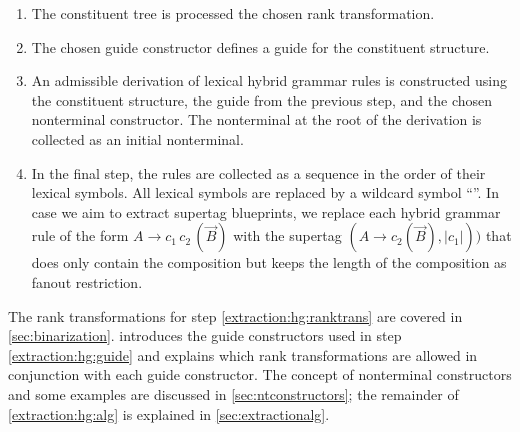 \documentclass[../../document.tex]{subfiles}
\begin{document}
    \begin{enumerate}
        \item\label{extraction:hg:ranktrans}
            The constituent tree is processed the chosen rank transformation.
        \item\label{extraction:hg:guide}
            The chosen guide constructor defines a guide for the constituent structure.
        \item\label{extraction:hg:alg}
            An admissible derivation of lexical hybrid grammar rules is constructed using the constituent structure, the guide from the previous step, and the chosen nonterminal constructor.
            The  nonterminal at the root of the derivation is collected as an initial nonterminal.
        \item
            In the final step, the rules are collected as a sequence in the order of their lexical symbols.
            All lexical symbols are replaced by a wildcard symbol ``\tn{*}''.
            In case we aim to extract  supertag blueprints, we replace each hybrid grammar rule of the form \(A \to c_1\,c_2\,(\vec{B})\) with the  supertag \((A \to c_2 (\vec{B}), |c_1|))\) that does only contain the  composition but keeps the length of the  composition as fanout restriction.
    \end{enumerate}
    The rank transformations for step \ref{extraction:hg:ranktrans} are covered in \cref{sec:binarization}.
     introduces the guide constructors used in step \ref{extraction:hg:guide} and explains which rank transformations are allowed in conjunction with each guide constructor.
    The concept of nonterminal constructors and some examples are discussed in \cref{sec:ntconstructors}; the remainder of \cref{extraction:hg:alg} is explained in \cref{sec:extractionalg}.
    

    
    
    

    \ifSubfilesClassLoaded{%
        \printindex
    }{}
\end{document}
